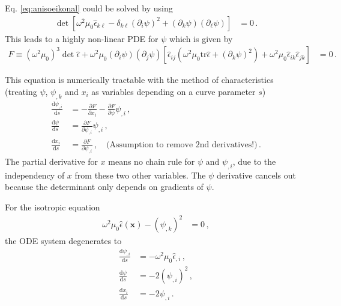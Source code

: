 \documentclass[12pt,a4paper,twoside,openright,BCOR10mm,headsepline,titlepage,abstracton,chapterprefix,final]{scrreprt}
\newcommand\Vector[1]{{\mathbf{#1}}}
\newcommand\Tensor[1]{\hat{#1}}
\newcommand\permittivity{\Tensor{\epsilon}}
\begin{document}
Eq. \eqref{eq:anisoeikonal} could be solved by using
\begin{align}
 \det  \left[\omega^2 \mu_0 \permittivity_{k\ell} - \delta_{k\ell} (\partial_i \psi)^2 + (\partial_k \psi)(\partial_\ell \psi)\right] &= 0\,.
\end{align}
This leads to a highly non-linear PDE for $\psi$ which is given by
\begin{align}
 F\equiv(\omega^2 \mu_0)^3 \det \permittivity + \omega^2 \mu_0 (\partial_i \psi)(\partial_j \psi)\left[\permittivity_{ij} (\omega^2 \mu_0 \text{tr}\permittivity + (\partial_k \psi)^2) + \omega^2 \mu_0 \permittivity_{ik} \permittivity_{jk}\right] &= 0\,.
\end{align}

This equation is numerically tractable with the method of characteristics (treating $\psi$, $\psi_{,k}$ and $x_i$ as variables depending on a curve parameter $s$)
\begin{align}
 \frac{\text{d}\psi_{,i}}{\text{d}s} &= -\frac{\partial F}{\partial x_i} - \frac{\partial F}{\partial \psi} \psi_{,i}\,,\\
 \frac{\text{d}\psi}{\text{d}s} &= \frac{\partial F}{\partial \psi_{,i}} \psi_{,i}\,,\\
 \frac{\text{d}x_i}{\text{d}s} &= \frac{\partial F}{\partial \psi_{,i}}\,,\quad \text{(Assumption to remove 2nd derivatives!)}\,. 
\end{align}
The partial derivative for $x$ means no chain rule for $\psi$ and $\psi_{,i}$, due to the independency of $x$ from these two other variables.
The $\psi$ derivative cancels out because the determinant only depends on gradients of $\psi$.

For the isotropic equation
\begin{align}
 \omega^2 \mu_0 \permittivity(\Vector{x}) - (\psi_{,k})^2&= 0\,,
\end{align}
the ODE system degenerates to
\begin{align}
 \frac{\text{d}\psi_{,i}}{\text{d}s} &= -\omega^2 \mu_0 \permittivity_{,i}\,,\\
 \frac{\text{d}\psi}{\text{d}s} &= -2 (\psi_{,i})^2\,,\\
 \frac{\text{d}x_i}{\text{d}s} &= -2 \psi_{,i}\,. 
\end{align}
\end{document}
